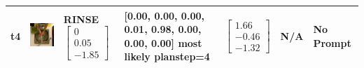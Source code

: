 \begin{longtable}{| V{0.8cm} | V{2.6cm} | V{1.6cm} | V{2.1cm} | V{1.55cm} | V{1.6cm} | V{3.2cm} |}
t4 &
\includegraphics[width=\linewidth]{fig/system/_slow2-rinse2_.jpg} &
RINSE
\linebreak\linebreak
$\begin{bmatrix}
0 \\
0.05 \\
-1.85
\end{bmatrix}$ &
[0.00, 0.00, 0.00, 0.01, 0.98, 0.00, 0.00, 0.00] most likely planstep=4 &
$\begin{bmatrix}
1.66 \\
-0.46 \\
-1.32
\end{bmatrix}$ &
N/A &
No Prompt
\\ \hline



\end{longtable}
